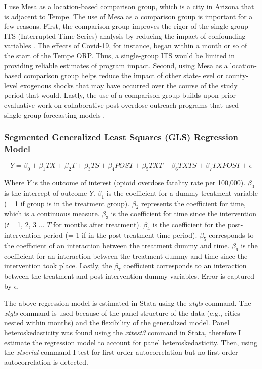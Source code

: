 I use Mesa as a location-based comparison group, which is a city in Arizona that is adjacent to Tempe. The use of Mesa as a comparison group is important for a few reasons. First, the comparison group improves the rigor of the single-group ITS (Interrupted Time Series) analysis by reducing the impact of confounding variables \parencite{shadish_experimental_2002}. The effects of Covid-19, for instance, began within a month or so of the start of the Tempe ORP. Thus, a single-group ITS would be limited in providing reliable estimates of program impact. Second, using Mesa as a location-based comparison group helps reduce the impact of other state-level or county-level exogenous shocks that may have occurred over the course of the study period that would. Lastly, the use of a comparison group builds upon prior evaluative work on collaborative post-overdose outreach programs that used single-group forecasting models \parencite{donnelly_law_2022}.

\subsubsection{Segmented Generalized Least Squares (GLS) Regression Model}

\[Y = \beta_0 + \beta_1 TX + \beta_2 T + \beta_3 TS + \beta_4 POST + \beta_5 TXT + \beta_6 TXTS + \beta_7 TXPOST + \epsilon \]

Where \(Y\) is the outcome of interest (opioid overdose fatality rate per 100,000). \(\beta_0\) is the intercept of outcome \(Y\). \(\beta_1\) is the coefficient for a dummy treatment variable (= 1 if group is in the treatment group). \(\beta_2\) represents the coefficient for time, which is a continuous measure. \(\beta_3\) is the coefficient for time since the intervention (\(t\)= 1, 2, 3 ... \(T\) for months after treatment). \(\beta_4\) is the coefficient for the post-intervention period (= 1 if in the post-treatment time period).  \(\beta_5\) corresponds to the coefficient of an interaction between the treatment dummy and time. \(\beta_6\) is the coefficient for an interaction between the treatment dummy and time since the intervention took place. Lastly, the \(\beta_7\) coefficient corresponds to an interaction between the treatment and post-intervention dummy variables. Error is captured by \(\epsilon\).

The above regression model is estimated in Stata \parencite{statacorp_stata_2023} using the \textit{xtgls} command. The \textit{xtgls} command is used because of the panel structure of the data (e.g., cities nested within months) and the flexibility of the generalized model. Panel heteroskedasticity was found using the \textit{xttest3} command in Stata, therefore I estimate the regression model to account for panel heteroskedasticity. Then, using the \textit{xtserial} command I test for first-order autocorrelation but no first-order autocorrelation is detected.  

